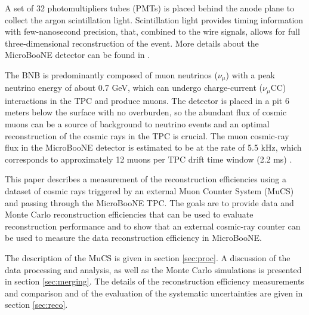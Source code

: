 \documentclass[a4paper,11pt]{article}
\begin{document}
A set of 32 photomultipliers tubes (PMTs) is placed behind the anode plane to collect the argon scintillation light. Scintillation light provides timing information with few-nanosecond precision, that, combined to the wire signals, allows for full three-dimensional reconstruction of the event. More details about the MicroBooNE detector can be found in \cite{detector}.

The BNB is predominantly composed of muon neutrinos ($\nu_{\mu}$) with a peak neutrino energy of about 0.7 GeV, which can undergo charge-current ($\nu_{\mu}$CC) interactions in the TPC and produce muons. The detector is placed in a pit 6 meters below the surface with no overburden, so the abundant flux of cosmic muons can be a source of background to neutrino events and an optimal reconstruction of the cosmic rays in the TPC is crucial. The muon cosmic-ray flux in the MicroBooNE detector is estimated to be at the rate of 5.5 kHz, which corresponds to approximately 12 muons per TPC drift time window (2.2 ms) \cite{cosmic}.

This paper describes a measurement of the reconstruction efficiencies using a dataset of cosmic rays triggered by an external Muon Counter System (MuCS) and passing through the MicroBooNE TPC. The goals are to provide data and Monte Carlo reconstruction efficiencies that can be used to evaluate reconstruction performance and to show that an external cosmic-ray counter can be used to measure the data reconstruction efficiency in MicroBooNE.

The description of the MuCS is given in section \ref{sec:proc}. A discussion of the data processing and analysis, as well as the Monte Carlo simulations is presented in section \ref{sec:merging}. The details of the reconstruction efficiency measurements and comparison and of the evaluation of the systematic uncertainties are given in section \ref{sec:reco}.


\end{document}
